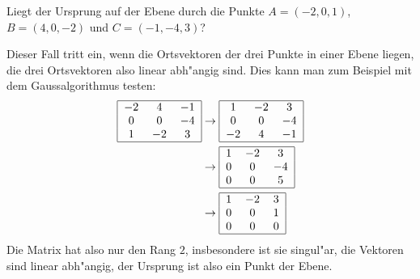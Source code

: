 Liegt der Ursprung  auf der Ebene durch die Punkte
$A=(-2, 0, 1)$, $B=(4,0,-2)$ und $C=(-1,-4,3)$?

\begin{loesung}
Dieser Fall tritt ein, wenn die Ortsvektoren der drei Punkte
in einer Ebene liegen, die drei Ortsvektoren also linear abh"angig
sind. Dies kann man zum Beispiel mit dem Gaussalgorithmus testen:
\begin{align*}
\begin{tabular}{|ccc|}
\hline
$-2$&4&$-1$\\
0&0&$-4$\\
1&$-2$&3\\
\hline
\end{tabular}
&\rightarrow
\begin{tabular}{|ccc|}
\hline
1&$-2$&3\\
0&0&$-4$\\
$-2$&4&$-1$\\
\hline
\end{tabular}
\\
&\rightarrow
\begin{tabular}{|ccc|}
\hline
1&$-2$&3\\
0&0&$-4$\\
0&0&5\\
\hline
\end{tabular}
\\
&\rightarrow
\begin{tabular}{|ccc|}
\hline
1&$-2$&3\\
0&0&1\\
0&0&0\\
\hline
\end{tabular}
\end{align*}
Die Matrix hat also nur den Rang $2$, insbesondere ist sie singul"ar,
die Vektoren sind linear abh"angig, der Ursprung ist also ein Punkt
der Ebene.


\end{loesung}
